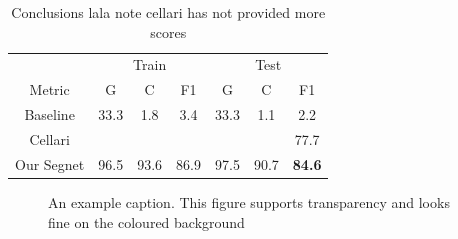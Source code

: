 \documentclass[
]{dtuposter}
\begin{document}
\begin{dtupostercontent}
\begin{table}
\begin{tabular}{c|ccc|ccc|}
		\rule[-1ex]{0pt}{2.5ex}  & \multicolumn{3}{c|}{Train} &  \multicolumn{3}{c|}{Test} \\ 
		
		\rule[-1ex]{0pt}{2.5ex} Metric  & G & C & F1 & G & C & F1 \\ 
		\hline
		\rule[-1ex]{0pt}{2.5ex} Baseline&  33.3 &1.8  &3.4  &33.3  &1.1  &2.2  \\ 
		
		\rule[-1ex]{0pt}{2.5ex} Cellari    &  &  &  &  &  &77.7  \\ 
		\hline 
		\rule[-1ex]{0pt}{2.5ex} Our Segnet & 96.5&93.6  & 86.9 &97.5  & 90.7  &\textbf{84.6}  \\ 
	\end{tabular} 
\caption{Conclusions lala note cellari has not provided more scores}
\end{table}




\begin{figure}
	\centering
{}
\caption{An example caption. This figure supports transparency and looks fine on 
the coloured background}\label{fig:example}
\end{figure}



\end{dtupostercontent}
\end{document}
